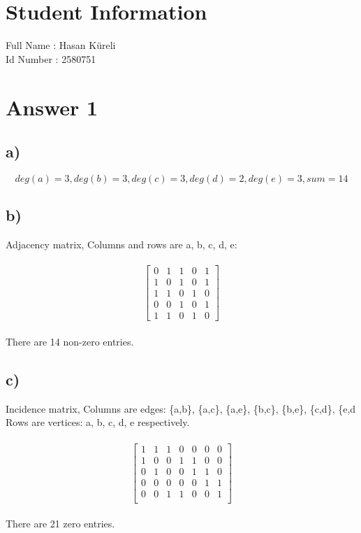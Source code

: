 \documentclass[12pt]{article}
\begin{document}
\section*{Student Information } 
Full Name : Hasan Küreli\\
Id Number :  2580751\\

\section*{Answer 1}
\subsection*{a) }
$$deg(a)=3, deg(b)=3, deg(c)=3, deg(d)=2, deg(e)=3,sum= 14 $$

\subsection*{b) }
Adjacency matrix, Columns and rows are a, b, c, d, e:\\\\
$$\begin{bmatrix}
0 & 1 & 1 & 0 & 1\\
1 & 0 & 1 & 0 & 1\\
1 & 1 & 0 & 1 & 0\\
0 & 0 & 1 & 0 & 1\\
1 & 1 & 0 & 1 & 0 
\end{bmatrix}$$\\
There are 14 non-zero entries.

\subsection*{c) }
Incidence matrix, Columns are edges: \{a,b\}, \{a,c\}, \{a,e\}, \{b,c\}, \{b,e\}, \{c,d\}, \{e,d\\
Rows are vertices: a, b, c, d, e respectively.\\\\
$$\begin{bmatrix}
1 & 1 & 1 & 0 & 0 & 0 & 0\\
1 & 0 & 0 & 1 & 1 & 0 & 0\\
0 & 1 & 0 & 0 & 1 & 1 & 0\\
0 & 0 & 0 & 0 & 0 & 1 & 1\\
0 & 0 & 1 & 1 & 0 & 0 & 1\\
\end{bmatrix}$$\\
There are 21 zero entries.
\end{document}
